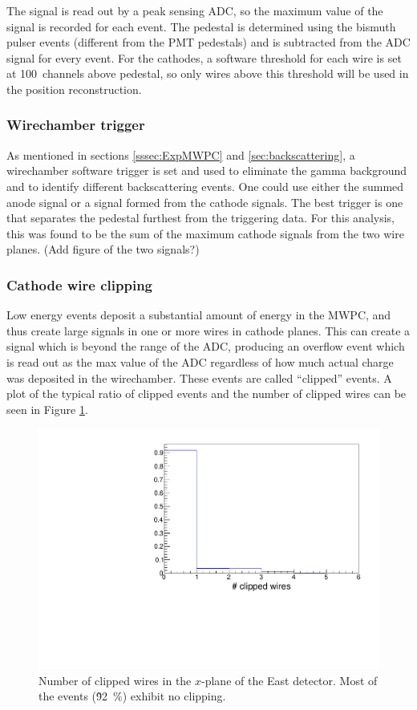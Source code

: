 The signal is read out by a peak sensing ADC, so the maximum value of the signal is recorded
for each event. The pedestal is determined using the bismuth pulser events (different from the
PMT pedestals) and is subtracted from the ADC signal for every event. For the cathodes, a software
threshold for each wire is set at 100~channels above pedestal, so only wires above this threshold
will be used in the position reconstruction.

\subsubsection{Wirechamber trigger} \label{sssec:mwpctrigg}

As mentioned in sections \ref{sssec:ExpMWPC} and \ref{sec:backscattering}, a wirechamber
software trigger is set and used to eliminate the gamma background and to identify different
backscattering events. One could use either the summed anode signal or a signal formed from
the cathode signals. The best trigger is one that separates the pedestal furthest from the
triggering data. For this analysis, this was found to be the sum of the maximum cathode
signals from the two wire planes. (Add figure of the two signals?)

\subsubsection{Cathode wire clipping}

Low energy events deposit a substantial amount of energy in the MWPC, and thus create large
signals in one or more wires in cathode planes. This can create a signal which is beyond the
range of the ADC, producing an overflow event which is read out as the max value of the ADC
regardless of how much actual charge was deposited in the wirechamber.
These events are called ``clipped'' events. A plot of the typical ratio of clipped events and the
number of clipped wires can be seen in Figure \ref{fig:nClipped}.

\begin{figure}[h]
  \centering
  \includegraphics[scale=0.6,page=1]{4-UCNACalibrations/mwpc_position.pdf} 
  \caption{Number of clipped wires in the $x$-plane of the East detector. Most of the events
    (\~92~\%) exhibit no clipping.}
  \label{fig:nClipped}
\end{figure}


